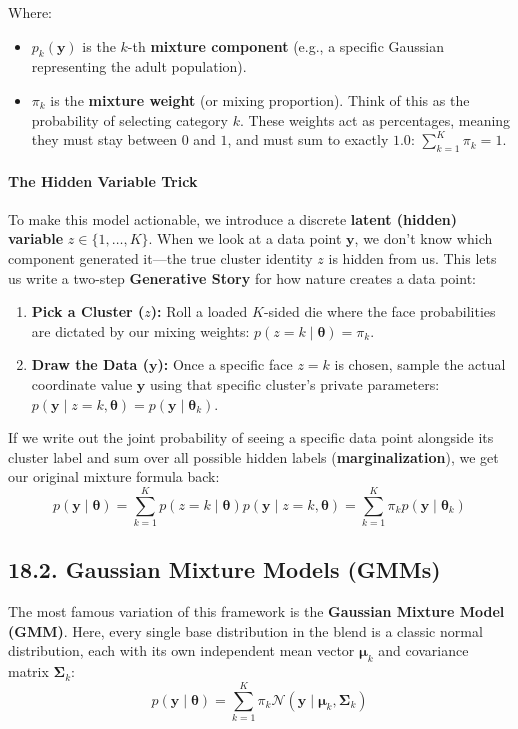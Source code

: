 \documentclass{article}
\begin{document}
Where:
\begin{itemize}
    \item $p_k(\mathbf{y})$ is the $k$-th \textbf{mixture component} (e.g., a specific Gaussian representing the adult population).
    \item $\pi_k$ is the \textbf{mixture weight} (or mixing proportion). Think of this as the probability of selecting category $k$. These weights act as percentages, meaning they must stay between $0$ and $1$, and must sum to exactly $1.0$: $\sum_{k=1}^K \pi_k = 1$.
\end{itemize}

\paragraph{The Hidden Variable Trick}
To make this model actionable, we introduce a discrete \textbf{latent (hidden) variable} $z \in \{1, \dots, K\}$. When we look at a data point $\mathbf{y}$, we don't know which component generated it—the true cluster identity $z$ is hidden from us. This lets us write a two-step \textbf{Generative Story} for how nature creates a data point:
\begin{enumerate}
    \item \textbf{Pick a Cluster ($z$):} Roll a loaded $K$-sided die where the face probabilities are dictated by our mixing weights: $p(z = k \mid \boldsymbol{\theta}) = \pi_k$.
    \item \textbf{Draw the Data ($\mathbf{y}$):} Once a specific face $z=k$ is chosen, sample the actual coordinate value $\mathbf{y}$ using that specific cluster's private parameters: $p(\mathbf{y} \mid z = k, \boldsymbol{\theta}) = p(\mathbf{y} \mid \boldsymbol{\theta}_k)$.
\end{enumerate}

If we write out the joint probability of seeing a specific data point alongside its cluster label and sum over all possible hidden labels (\textbf{marginalization}), we get our original mixture formula back:
\begin{equation}
p(\mathbf{y} \mid \boldsymbol{\theta}) = \sum_{k=1}^K p(z = k \mid \boldsymbol{\theta}) p(\mathbf{y} \mid z = k, \boldsymbol{\theta}) = \sum_{k=1}^K \pi_k p(\mathbf{y} \mid \boldsymbol{\theta}_k) \tag{114}
\end{equation}

\subsection*{18.2. Gaussian Mixture Models (GMMs)}
The most famous variation of this framework is the \textbf{Gaussian Mixture Model (GMM)}. Here, every single base distribution in the blend is a classic normal distribution, each with its own independent mean vector $\boldsymbol{\mu}_k$ and covariance matrix $\boldsymbol{\Sigma}_k$:
\begin{equation}
p(\mathbf{y} \mid \boldsymbol{\theta}) = \sum_{k=1}^K \pi_k \mathcal{N}(\mathbf{y} \mid \boldsymbol{\mu}_k, \boldsymbol{\Sigma}_k) \tag{115}
\end{equation}
\end{document}
